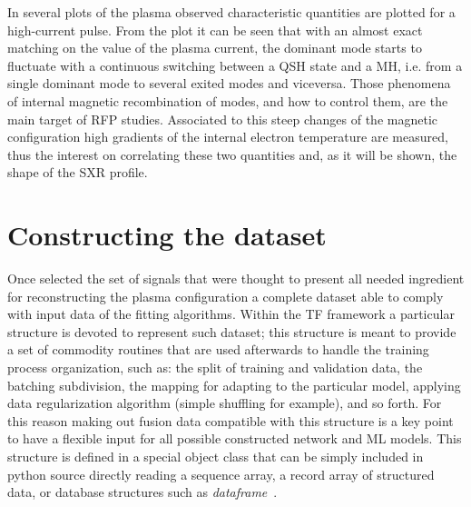 In \Figure{\ref{fig:rfx_shot_22069}} several plots of the plasma observed characteristic quantities are plotted for a high-current pulse. From the plot it can be seen that with an almost exact matching on the value of the plasma current, the dominant mode starts to fluctuate with a continuous switching between a QSH state and a MH, i.e. from a single dominant mode to several exited modes and viceversa. Those phenomena of internal magnetic recombination of modes, and how to control them, are the main target of RFP studies. 
Associated to this steep changes of the magnetic configuration high gradients of the internal electron temperature are measured, thus the interest on correlating these two quantities and, as it will be shown, the shape of the SXR profile. 


                                   
\section{Constructing the dataset} %
\label{section:SXR_dataset}


Once selected the set of signals that were thought to present all needed ingredient for reconstructing the plasma configuration a complete dataset able to comply with \Tensorflow input data of the fitting algorithms. Within the \acs{TF} framework a particular structure is devoted to represent such dataset; this structure is meant to provide a set of commodity routines that are used afterwards to handle the training process organization, such as: the split of training and validation data, the batching subdivision, the mapping for adapting to the particular model, applying data regularization algorithm (simple shuffling for example), and so forth.
For this reason making out fusion data compatible with this structure is a key point to have a flexible input for all possible constructed network and ML models. 
This structure is defined in a special \TF object class that can be simply included in python source directly reading a sequence array, a record array of structured data, or database structures such as \Pandas \textit{dataframe}~\cite{mckinney-proc-scipy-2010}.

